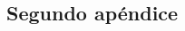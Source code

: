 \begin{landscapemode}{297mm}{420mm}
    \chapter{Segundo apéndice}
    \blindtext[5]
\end{landscapemode}